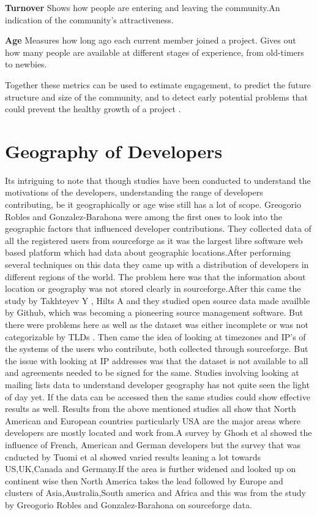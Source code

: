 \documentclass[seploa]{beavtex}
\begin{document}
\textbf{Turnover}
Shows how people are entering and leaving the community.An indication of the community's attractiveness.

\textbf{Age}
Measures how long ago each current member joined a project. Gives out how many people are available at different stages of experience, from old-timers to newbies.

Together these metrics can be used to estimate engagement, to predict the future structure and size of the community, and to detect early potential problems that could prevent the healthy growth of a project \cite{jes2014}.

\section{Geography of Developers}
Its intriguing to note that though studies have been conducted to understand the motivations of the developers, understanding the range of developers contributing, be it geographically or age wise still has a lot of scope. Greogorio Robles and Gonzalez-Barahona were among the first ones to look into the geographic factors that influenced developer contributions. They collected data of all the registered users from sourceforge as it was the largest libre software web based platform which had data about geographic locations.After performing several techniques on this data they came up with a distribution of developers in different regions of the world\cite{robles2006}. The problem here was that the information about location or geography was not stored clearly in sourceforge.After this came the study by Takhteyev Y , Hilts A and they studied open source data made availble by Github, which was becoming a pioneering source management software. But there were problems here as well as the dataset was either incomplete or was not categorizable by TLDs \cite{yuri2010}. Then came the idea of looking at timezones and IP's of the systems of the users who contribute, both collected through sourceforge. But the issue with looking at IP addresses was that the dataset is not available to all and agreements needed to be signed for the same\cite{von2010}. Studies involving looking at mailing lists data to understand developer geography has not quite seen the light of day yet. If the data can be accessed then the same studies could show effective results as well. Results from the above mentioned studies all show that North American and European countries particularly USA are the major areas where developers are mostly located and work from.A survey by Ghosh et al\cite{ghosh2005} showed the influence of French, American and German developers but the survey that was cnducted by Tuomi et al\cite{tuomi2004} showed varied results leaning a lot towards US,UK,Canada and Germany.If the area is further widened and looked up on continent wise then North America takes the lead followed by Europe and clusters of Asia,Australia,South america and Africa and this was from the study by Greogorio Robles and Gonzalez-Barahona on sourceforge data\cite{robles2006}.
\end{document}
